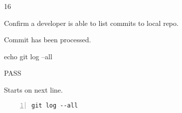\begin{description}[align=right,leftmargin=3.2cm,labelindent=3.0cm]
\item[Step:] 16
\item[Confirm:] Confirm a developer is able to list commits to local repo.
\item[Expectation:] Commit has been processed.
\item[Command:] echo git  log --all
\item[Test Result:] PASS
\item[Evidence:] Starts on next line.
\end{description}
\begin{lstlisting}[numbers=left]
git log --all

\end{lstlisting}
